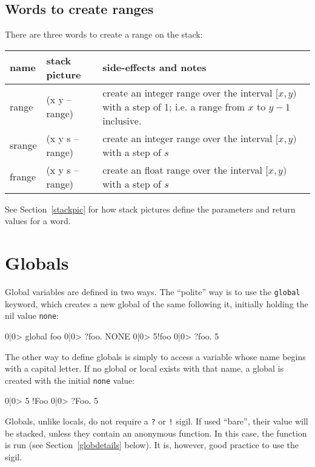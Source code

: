 \subsection{Words to create ranges}
There are three words to create a range on the stack:
\begin{center}
\begin{tabular}{|l|l|p{4in}|}\hline
\textbf{name} & \textbf{stack picture} & \textbf{side-effects and notes}\\ \hline
range & (x y -- range) & create an integer range over the interval $[x,y)$ with a step of 1; i.e. a range from $x$ to $y-1$ inclusive.\\
srange & (x y s -- range) &  create an integer range over the interval $[x,y)$ with a step of $s$\\
frange & (x y s -- range) &  create an float range over the interval $[x,y)$ with a step of $s$\\
\hline
\end{tabular}
\end{center}
See Section~\ref{stackpic} for how stack pictures define the parameters
and return values for a word.


\section{Globals}
Global variables are defined in two ways. The ``polite'' way is to use the 
\texttt{global} keyword, which creates a new global of the same following
it, initially holding the nil value \texttt{none}:
\begin{v}
0|0> global foo
0|0> ?foo.
NONE
0|0> 5!foo
0|0> ?foo.
5
\end{v}
The other way to define globals is simply to access a variable whose
name begins with a capital letter. If no global or local exists with that
name, a global is created with the initial \texttt{none} value:
\begin{v}
0|0> 5 !Foo
0|0> ?Foo.
5
\end{v}
Globals, unlike locals, do not require a \texttt{?} or \texttt{!} sigil.
If used ``bare'', their value will be stacked, unless they contain
an anonymous function. In this case, the function is run (see
Section~\ref{globdetails} below). It is, however, good practice to use
the sigil.

